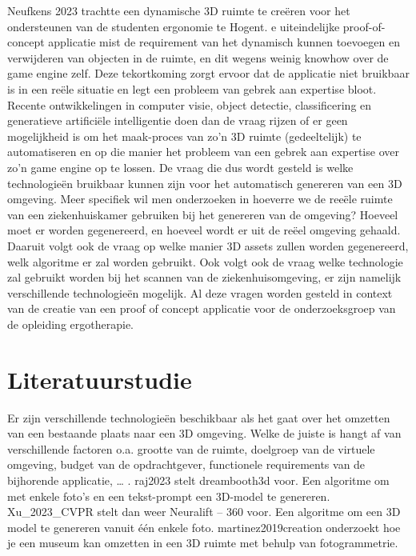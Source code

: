 \documentclass{hogent-article}
\begin{document}
Neufkens 2023 trachtte een dynamische 3D ruimte te creëren voor het ondersteunen van de studenten ergonomie te Hogent. e uiteindelijke proof-of-concept applicatie mist de requirement van het dynamisch kunnen toevoegen en verwijderen van objecten in de ruimte, en dit wegens weinig knowhow over de game engine zelf. Deze tekortkoming zorgt ervoor dat de applicatie niet bruikbaar is in een reële situatie en legt een probleem van gebrek aan expertise bloot. Recente ontwikkelingen in computer visie, object detectie, classificering en generatieve artificiële intelligentie doen dan de vraag rijzen of er geen mogelijkheid is om het maak-proces van zo’n 3D ruimte (gedeeltelijk) te automatiseren en op die manier het probleem van een gebrek aan expertise over  zo’n game engine op te lossen. De vraag die dus wordt gesteld is welke technologieën bruikbaar kunnen zijn voor het automatisch genereren van een 3D omgeving. Meer specifiek wil men onderzoeken in hoeverre we de reeële ruimte van een ziekenhuiskamer gebruiken bij het genereren van de omgeving? Hoeveel moet er worden gegenereerd, en hoeveel wordt er uit de reëel omgeving gehaald. Daaruit volgt ook de vraag op welke manier 3D assets zullen worden gegenereerd, welk algoritme er zal worden gebruikt. Ook volgt ook de vraag welke technologie zal gebruikt worden bij het scannen van de ziekenhuisomgeving, er zijn namelijk verschillende technologieën mogelijk. Al deze vragen worden gesteld in context van de creatie van een proof of concept applicatie voor de onderzoeksgroep van de opleiding ergotherapie. 


\section{Literatuurstudie}%
\label{sec:literatuurstudie}


Er zijn verschillende technologieën beschikbaar als het gaat over het omzetten van een bestaande plaats naar een 3D omgeving. Welke de juiste is hangt af van verschillende factoren o.a. grootte van de ruimte, doelgroep van de virtuele omgeving, budget van de opdrachtgever, functionele requirements van de bijhorende applicatie, … . 
raj2023 stelt dreambooth3d voor. Een algoritme om met enkele foto’s en een tekst-prompt  een 3D-model te genereren.
Xu_2023_CVPR stelt dan weer Neuralift – 360 voor.  Een algoritme om een 3D model te genereren vanuit één enkele foto.
martinez2019creation onderzoekt hoe je een museum kan omzetten in een 3D ruimte met behulp van fotogrammetrie. 
\end{document}
